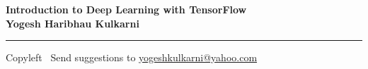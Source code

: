 
\graphicspath{{images/}}


\footnotesize


\begin{center}
\Large{\textbf{Introduction to Deep Learning with TensorFlow\\ Yogesh Haribhau Kulkarni}}  
\end{center}

\begin{multicols}{2}

\end{multicols}

\rule{\linewidth}{0.25pt}
\scriptsize
Copyleft \textcopyleft\  Send suggestions to 
\href{http://www.yogeshkulkarni.com}{yogeshkulkarni@yahoo.com}


